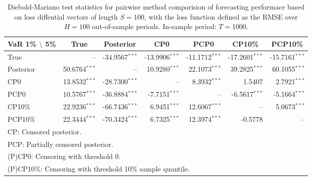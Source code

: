 { \renewcommand{\arraystretch}{1.2} 
\begin{table} 
\center 
\begin{tabular}{l | rrr rrr} 
VaR 1\% $\setminus$ 5\% & \multicolumn{1}{c}{True} & \multicolumn{1}{c}{Posterior} & \multicolumn{1}{c}{CP0} & \multicolumn{1}{c}{PCP0} & \multicolumn{1}{c}{CP10\%} & \multicolumn{1}{c}{PCP10\%} \\ \hline 
True &    --\phantom{$^{***}$} & -34.9567$^{***}$ & -13.9906$^{***}$ & -11.1712$^{***}$ & -17.2601$^{***}$ & -15.7161$^{***}$  \\ 
Posterior & 50.6764$^{***}$ &    --\phantom{$^{***}$} & 10.9280$^{***}$ & 22.1073$^{***}$ & 39.2825$^{***}$ & 60.1055$^{***}$  \\ 
CP0 & 13.8532$^{***}$ & -28.7300$^{***}$ &    --\phantom{$^{***}$} & 8.3932$^{***}$ & 1.5407\phantom{$^{***}$} & 2.7921$^{***}$  \\ 
PCP0 & 10.5767$^{***}$ & -36.8884$^{***}$ & -7.7151$^{***}$ &    --\phantom{$^{***}$} & -6.5617$^{***}$ & -5.1664$^{***}$  \\ 
CP10\% & 22.9236$^{***}$ & -66.7436$^{***}$ & 6.9451$^{***}$ & 12.6067$^{***}$ &    --\phantom{$^{***}$} & 5.0673$^{***}$  \\ 
PCP10\% & 22.3444$^{***}$ & -70.3424$^{***}$ & 6.7325$^{***}$ & 12.3974$^{***}$ & -0.5778\phantom{$^{***}$} &    --\phantom{$^{***}$}  \\ 
\hline 
\multicolumn{7}{l}{\footnotesize{CP: Censored posterior.}}  \\ 
\multicolumn{7}{l}{\footnotesize{PCP: Partially censored posterior.}} \\ 
\multicolumn{7}{l}{\footnotesize{(P)CP0: Censoring with threshold 0.}} \\ 
\multicolumn{7}{l}{\footnotesize{(P)CP10\%: Censoring with threshold 10\% sample quantile.}}  \\ 
\end{tabular}
 \caption{Diebold-Mariano test statistics for  pairwise method comparision of forecasting performace based on loss diffential vectors of length $S = 100$, with the loss function defined as the RMSE over $H=100$ out-of-sample periods. In-sample period: $T = 1000$.} 
\label{tab:ar1_DM_T_1000}  
\end{table}
}